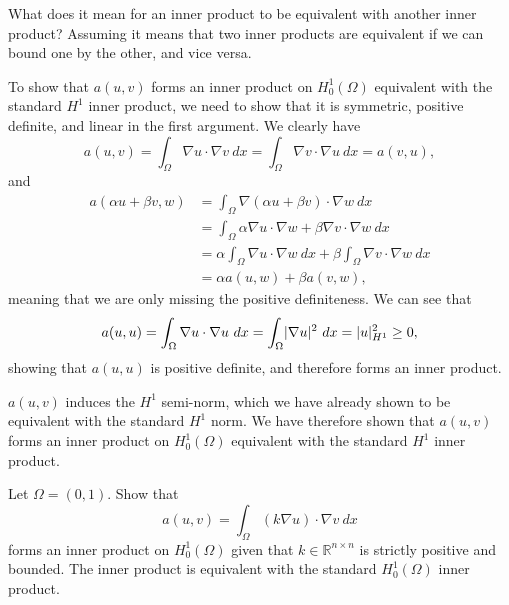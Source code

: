 \begin{solution}
    \textcolor{red!75}{What does it mean for an inner product to be equivalent with another inner product?}
    \textcolor{blue!50}{Assuming it means that two inner products are equivalent if we can bound one by the other, and vice versa.}

    \noindent
    To show that $a(u, v)$ forms an inner product on $H^1_0(\Omega)$ equivalent with the standard $H^1$ inner product, we need to show that it is symmetric, positive definite, and linear in the first argument.
    We clearly have
    \begin{equation*}
        a(u, v) = \int_\Omega \nabla u \cdot \nabla v \ dx = \int_\Omega \nabla v \cdot \nabla u \ dx = a(v, u),
    \end{equation*}
    and
    \begin{align*}
        a(\alpha u + \beta v, w)
        &= \int_\Omega \nabla (\alpha u + \beta v) \cdot \nabla w \ dx \\
        &= \int_\Omega \alpha \nabla u \cdot \nabla w + \beta \nabla v \cdot \nabla w \ dx \\
        &= \alpha \int_\Omega \nabla u \cdot \nabla w \ dx + \beta \int_\Omega \nabla v \cdot \nabla w \ dx \\
        &= \alpha a(u, w) + \beta a(v, w),
    \end{align*}
    meaning that we are only missing the positive definiteness.
    We can see that
    \begin{equation*}
        a(u, u) = \int_\Omega \nabla u \cdot \nabla u \ dx = \int_\Omega \lvert \nabla u \rvert^2 \ dx = \abs{u}_{H^1}^2 \geq 0,
    \end{equation*}
    showing that $a(u, u)$ is positive definite, and therefore forms an inner product.

    $a(u, v)$ induces the $H^1$ semi-norm, which we have already shown to be equivalent with the standard $H^1$ norm.
    We have therefore shown that $a(u, v)$ forms an inner product on $H^1_0(\Omega)$ equivalent with the standard $H^1$ inner product.
\end{solution}

\begin{exercise}
    Let $\Omega = (0, 1)$.
    Show that
    \begin{equation*}
        a(u, v) = \int_\Omega (k \nabla u) \cdot \nabla v \ dx
    \end{equation*}
    forms an inner product on $H^1_0(\Omega)$ given that $k \in \mathbb{R}^{n \times n}$ is strictly positive and bounded.
    The inner product is equivalent with the standard $H^1_0(\Omega)$ inner product.
\end{exercise}

